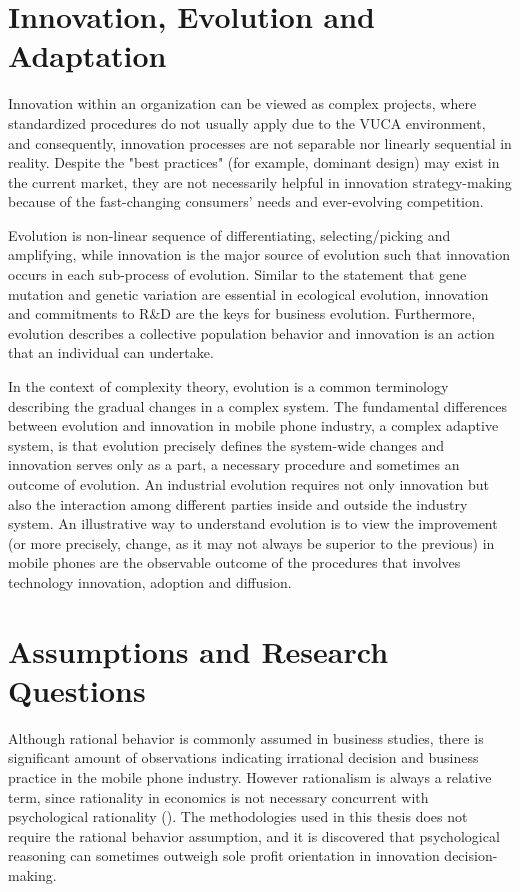 \documentclass[utf8,english]{gradu3}
\begin{document}
\section{Innovation, Evolution and Adaptation}

Innovation within an organization can be viewed as complex projects, where standardized  procedures do not usually apply due to the VUCA environment, and consequently, innovation processes are not separable nor linearly sequential in reality. Despite the "best practices" (for example, dominant design) may exist in the current market, they are not necessarily helpful in innovation strategy-making because of the fast-changing consumers' needs and ever-evolving competition. 

Evolution is non-linear sequence of differentiating, selecting/picking and amplifying, while innovation is the major source of evolution such that innovation occurs in each sub-process of evolution. Similar to the statement that gene mutation and genetic variation are essential in ecological evolution, innovation and commitments to R\&D are the keys for business evolution. Furthermore, evolution describes a collective population behavior and innovation is an action that an individual can undertake.

In the context of complexity theory, evolution is a common terminology describing the gradual changes in a complex system. The fundamental differences between evolution and innovation in mobile phone industry, a complex adaptive system, is that evolution precisely defines the system-wide changes and innovation serves only as a part, a necessary procedure and sometimes an outcome of evolution. An industrial evolution requires not only innovation but also the interaction among different parties inside and outside the industry system. An illustrative way to understand evolution is to view the improvement (or more precisely, change, as it may not always be superior to the previous) in mobile phones are the observable outcome of the procedures that involves technology innovation, adoption and diffusion.

\section{Assumptions and Research Questions}

Although rational behavior is commonly assumed in business studies, there is significant amount of observations indicating irrational decision and business practice in the mobile phone industry. However rationalism is always a relative term, since rationality in economics is not necessary concurrent with psychological rationality (\cite{hogarth1987rational}). The methodologies used in this thesis does not require the rational behavior assumption, and it is discovered that psychological reasoning can sometimes outweigh sole profit orientation in innovation decision-making.
\end{document}
